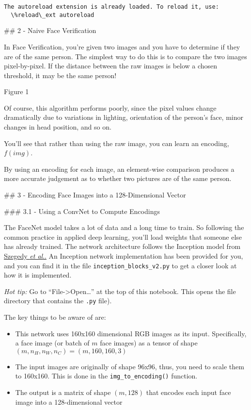 \documentclass[11pt]{article}
\providecommand{\tightlist}{%
      \setlength{\itemsep}{0pt}\setlength{\parskip}{0pt}}
\begin{document}
    \begin{Verbatim}[commandchars=\\\{\}]
The autoreload extension is already loaded. To reload it, use:
  \%reload\_ext autoreload
    \end{Verbatim}

    \#\# 2 - Naive Face Verification

In Face Verification, you're given two images and you have to determine
if they are of the same person. The simplest way to do this is to
compare the two images pixel-by-pixel. If the distance between the raw
images is below a chosen threshold, it may be the same person!

Figure 1

Of course, this algorithm performs poorly, since the pixel values change
dramatically due to variations in lighting, orientation of the person's
face, minor changes in head position, and so on.

You'll see that rather than using the raw image, you can learn an
encoding, \(f(img)\).

By using an encoding for each image, an element-wise comparison produces
a more accurate judgement as to whether two pictures are of the same
person.

    \#\# 3 - Encoding Face Images into a 128-Dimensional Vector

\#\#\# 3.1 - Using a ConvNet to Compute Encodings

The FaceNet model takes a lot of data and a long time to train. So
following the common practice in applied deep learning, you'll load
weights that someone else has already trained. The network architecture
follows the Inception model from
\href{https://arxiv.org/abs/1409.4842}{Szegedy \emph{et al}..} An
Inception network implementation has been provided for you, and you can
find it in the file \texttt{inception\_blocks\_v2.py} to get a closer
look at how it is implemented.

\emph{Hot tip:} Go to ``File-\textgreater Open\ldots{}'' at the top of
this notebook. This opens the file directory that contains the
\texttt{.py} file).

The key things to be aware of are:

\begin{itemize}
\tightlist
\item
  This network uses 160x160 dimensional RGB images as its input.
  Specifically, a face image (or batch of \(m\) face images) as a tensor
  of shape \((m, n_H, n_W, n_C) = (m, 160, 160, 3)\)
\item
  The input images are originally of shape 96x96, thus, you need to
  scale them to 160x160. This is done in the
  \texttt{img\_to\_encoding()} function.
\item
  The output is a matrix of shape \((m, 128)\) that encodes each input
  face image into a 128-dimensional vector
\end{itemize}
\end{document}

